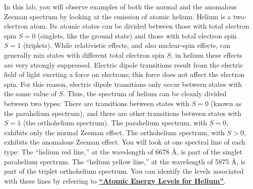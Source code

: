 \documentclass{../lab}
\begin{document}
In this lab, you will observe examples of both the normal and the anomalous Zeeman spectrum by looking at the emission of atomic helium.  Helium is a two-electron atom.  Its atomic states can be divided between those with total electron spin $S=0$ (singlets, like the ground state) and those with total electron spin $S=1$ (triplets).  While relativistic effects, and also nuclear-spin effects, can generally mix states with different total electron spin $S$, in helium these effects are very strongly suppressed.  Electric dipole transitions result from the electric field of light exerting a force on electrons; this force does not affect the electron spin.  For this reason, electric dipole transitions only occur between states with the same value of $S$.  Thus, the spectrum of helium can be cleanly divided between two types:  There are transitions between states with $S=0$ (known as the parahelium spectrum), and there are other transitions between states with $S=1$ (the orthohelium spectrum).  The parahelium spectrum, with $S=0$, exhibits only the normal Zeeman effect.  The orthohelium spectrum, with $S > 0$, exhibits the anomalous Zeeman effect.  You will look at one spectral line of each type: The ``helium red line,'' at the wavelength of 6678 \AA, is part of the singlet parahelium spectrum.  The ``helium yellow line,'' at the wavelength of 5875 \AA, is part of the triplet orthohelium spectrum.  You can identify the levels associated with these lines by referring to \href{https://drive.google.com/file/d/1uO83LOrWNWJlQmFlDo8dnueioUUUC-lk/view?usp=drive_link}{\textbf{``Atomic Energy Levels for Helium''}}.



\end{document}
